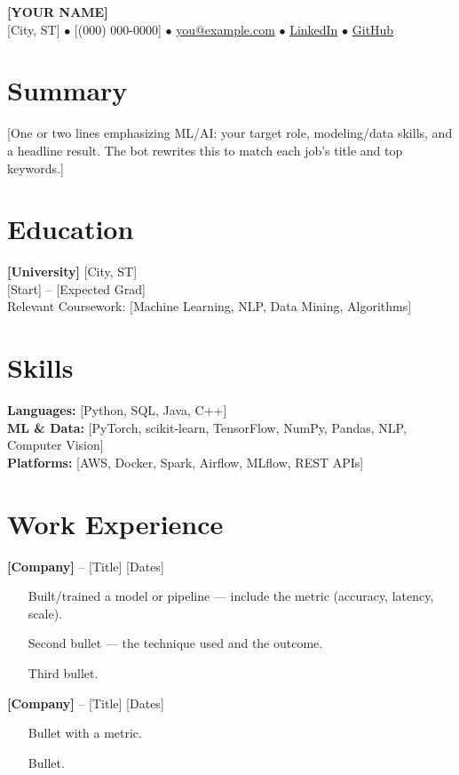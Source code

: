 \documentclass[a4paper,10pt]{article}
\begin{document}
\begin{center}
{\fontsize{16}{18}\selectfont \textbf{[YOUR NAME]}}\\[2pt]
\small [City, ST] $\bullet$ [(000) 000-0000] $\bullet$ \href{mailto:you@example.com}{you@example.com} $\bullet$ \href{https://linkedin.com/in/you}{LinkedIn} $\bullet$ \href{https://github.com/you}{GitHub}
\end{center}

\section*{Summary}
[One or two lines emphasizing ML/AI: your target role, modeling/data skills, and a
headline result. The bot rewrites this to match each job's title and top keywords.]

\section*{Education}
\textbf{[University]} \hfill [City, ST]\\
[Degree, Major] \hfill [Start] -- [Expected Grad]\\
Relevant Coursework: [Machine Learning, NLP, Data Mining, Algorithms]

\section*{Skills}
\textbf{Languages:} [Python, SQL, Java, C++]\\
\textbf{ML \& Data:} [PyTorch, scikit-learn, TensorFlow, NumPy, Pandas, NLP, Computer Vision]\\
\textbf{Platforms:} [AWS, Docker, Spark, Airflow, MLflow, REST APIs]

\section*{Work Experience}
\textbf{[Company]} -- [Title] \hfill [Dates]
\begin{itemize}[leftmargin=*, itemsep=0pt]
  \item [Built/trained a model or pipeline — include the metric (accuracy, latency, scale).]
  \item [Second bullet — the technique used and the outcome.]
  \item [Third bullet.]
\end{itemize}

\textbf{[Company]} -- [Title] \hfill [Dates]
\begin{itemize}[leftmargin=*, itemsep=0pt]
  \item [Bullet with a metric.]
  \item [Bullet.]
\end{itemize}
\end{document}
